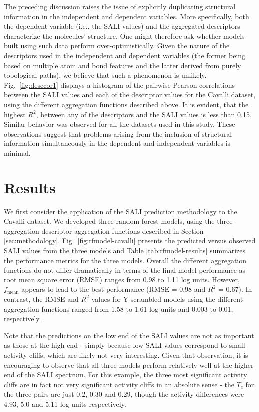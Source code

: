 \documentclass[letterpaper, 12pt]{article}
\begin{document}
The preceding discussion raises the issue of explicitly duplicating structural information in the
independent and dependent variables. More specifically, both the dependent variable (i.e., the SALI
values) and the aggregated descriptors characterize the molecules' structure. One might therefore
ask whether models built using such data perform over-optimistically. Given the nature of the
descriptors used in the independent and dependent variables (the former being based on multiple atom
and bond features and the latter derived from purely topological paths), we believe that such a
phenomenon is unlikely.  Fig.~\ref{fig:desccor1} displays a histogram of the pairwise Pearson
correlations between the SALI values and each of the descriptor values for the
Cavalli\cite{Cavalli:2002aa} dataset, using the different aggregation functions described above. It
is evident, that the highest $R^2$, between any of the descriptors and the SALI values is less than
0.15. Similar behavior was observed for all the datasets used in this study. These observations
suggest that problems arising from the inclusion of structural information simultaneously in the
dependent and independent variables is minimal.

\section{Results}
\label{sec:applications}
We first consider the application of the SALI prediction methodology to the Cavalli dataset. We
developed three random forest models, using the three aggregation descriptor aggregation functions
described in Section \ref{sec:methodology}. Fig.~\ref{fig:rfmodel-cavalli} presents the predicted
versus observed SALI values from the three models and Table \ref{tab:rfmodel-results} summarizes the
performance metrics for the three models. Overall the different aggregation functions do not differ
dramatically in terms of the final model performance as root mean square error (RMSE) ranges from
0.98 to 1.11 log units. However, $f_{\textrm{mean}}$ appears to lead to the best performance (RMSE = 0.98 and
$R^2$ = 0.67). In contrast, the RMSE and $R^2$ values for Y-scrambled\cite{Rucker:2007aa} models
using the different aggregation functions ranged from 1.58 to 1.61 log units and 0.003 to 0.01, respectively.

Note that the predictions on the low end of the SALI values are not as important as those at the
high end - simply because low SALI values correspond to small activity cliffs, which are likely not
very interesting. Given that observation, it is encouraging to observe that all three models perform
relatively well at the higher end of the SALI spectrum. For this example, the three most significant
activity cliffs are in fact not very significant activity cliffs in an absolute sense - the $T_c$
for the three pairs are just 0.2, 0.30 and 0.29, though the activity differences were 4.93, 5.0 and
5.11 log units respectively.
\end{document}
